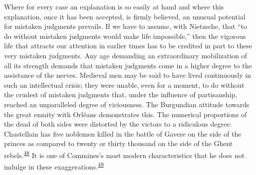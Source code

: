 Where for every case an explanation is so easily at hand and where this
explanation, once it has been accepted, is firmly believed, an unusual
potential for mistaken judgments prevails. If we have to assume, with
Nietzsche, that ``to do without mistaken judgments would make life
impossible,'' then the vigorous life that attracts our attention in
earlier times has to be credited in part to these very mistaken
judgments. Any age demanding an extraordinary mobilization of all its
strength demands that mistaken judgments come in a higher degree to the
assistance of the nerves. Medieval men may be said to have lived
continuously in such an intellectual crisis; they were unable, even for
a moment, to do without the crudest of mistaken judgments that, under
the influence of partisanship, reached an unparalleled degree of
viciousness. The
\protect\hypertarget{18_Chapter_Eleven__THE_FORMS_OF_THO.xhtmlux5cux23page_283}{}{}Burgundian
attitude towards the great enmity with Orléans demonstrates this. The
numerical proportions of the dead of both sides were distorted by the
victors to a ridiculous degree: Chastellain has five noblemen killed in
the battle of Gavere on the side of the princes as compared to twenty or
thirty thousand on the side of the Ghent
rebels.\textsuperscript{\protect\hypertarget{18_Chapter_Eleven__THE_FORMS_OF_THO.xhtmlux5cux23id_537}{\protect\hyperlink{23_NOTES.xhtmlux5cux23id_538}{48}}}
It is one of Commines's most modern characteristics that he does not
indulge in these
exaggerations.\textsuperscript{\protect\hypertarget{18_Chapter_Eleven__THE_FORMS_OF_THO.xhtmlux5cux23id_535}{\protect\hyperlink{23_NOTES.xhtmlux5cux23id_536}{49}}}

